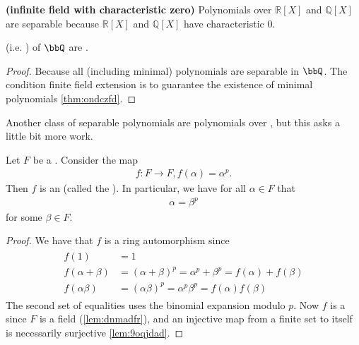 \documentclass{article}
\newcommand{\bfs}[1]{\textbf{({#1}) }}
\begin{document}
\begin{exma}\bfs{infinite field with characteristic zero}
Polynomials over $\mathbb{R}[X]$ and $\mathbb{Q}[X]$ are separable because $\mathbb{R}[X]$ and $\mathbb{Q}[X]$ have characteristic 0.
\end{exma}

\begin{cora}
  (i.e. ) of $\bbQ$ are .
\end{cora}
\begin{proof}
Because all (including minimal) polynomials  are separable in $\bbQ$. The condition finite field extension is to guarantee the existence of minimal polynomials \cref{thm:ondczfd}.
\end{proof}






Another class of separable polynomials are polynomials over , but this asks a little bit more work.








\begin{lema}\label{lem:quebda}
Let $F$ be a . Consider the map
\begin{align*}
f: F \rightarrow F, f(\alpha)=\alpha^{p} .
\end{align*}
Then $f$ is an  (called the ). In particular, we have for all $\alpha \in F$ that
\begin{align*}
\alpha=\beta^{p}
\end{align*}
for some $\beta \in F$.
\end{lema} 
\begin{proof}
We have that $f$ is a ring automorphism since
\begin{align*}
\begin{aligned}
f(1) &=1 \\
f(\alpha+\beta) &=(\alpha+\beta)^{p}=\alpha^{p}+\beta^{p}=f(\alpha)+f(\beta) \\
f(\alpha \beta) &=(\alpha \beta)^{p}=\alpha^{p} \beta^{p}=f(\alpha) f(\beta)
\end{aligned}
\end{align*}
The second set of equalities uses the binomial expansion modulo $p$. Now $f$ is a  since $F$ is a field (\cref{lem:dnmadfr}), and an injective map from a finite set to itself is necessarily surjective \cref{lem:9oqjdad}.
\end{proof} 
\end{document}
